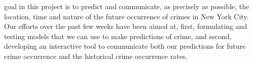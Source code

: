 \documentclass[10pt,journal,compsoc]{IEEEtran}
\begin{document}
%
%
%
%
 goal in this project is to predict and communicate, as
precisely as possible, the location, time and nature of the future occurrence of crimes in
New York City. Our efforts over the past few weeks have been aimed at, first,
formulating and testing models that we can use to make predictions of crime, and
second, developing an interactive tool to communicate both our predictions for future
crime occurrence and the historical crime occurrence rates.


%
%

\end{document}
